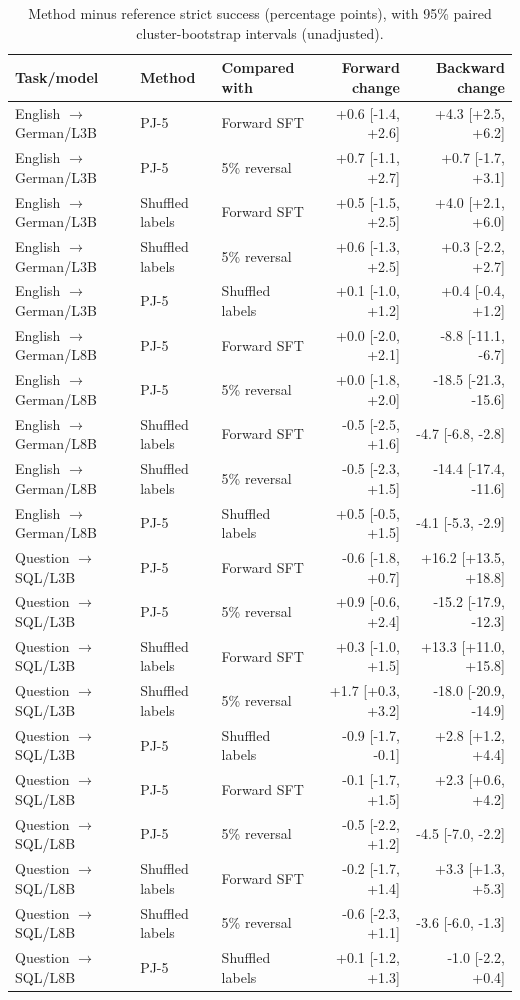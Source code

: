 \begin{table}[t]\centering\footnotesize
\begin{tabular}{lllrr}\toprule
Task/model & Method & Compared with & Forward change & Backward change \\\midrule
English $\to$ German/L3B & PJ-5 & Forward SFT & +0.6 [-1.4, +2.6] & +4.3 [+2.5, +6.2] \\
English $\to$ German/L3B & PJ-5 & 5\% reversal & +0.7 [-1.1, +2.7] & +0.7 [-1.7, +3.1] \\
English $\to$ German/L3B & Shuffled labels & Forward SFT & +0.5 [-1.5, +2.5] & +4.0 [+2.1, +6.0] \\
English $\to$ German/L3B & Shuffled labels & 5\% reversal & +0.6 [-1.3, +2.5] & +0.3 [-2.2, +2.7] \\
English $\to$ German/L3B & PJ-5 & Shuffled labels & +0.1 [-1.0, +1.2] & +0.4 [-0.4, +1.2] \\
English $\to$ German/L8B & PJ-5 & Forward SFT & +0.0 [-2.0, +2.1] & -8.8 [-11.1, -6.7] \\
English $\to$ German/L8B & PJ-5 & 5\% reversal & +0.0 [-1.8, +2.0] & -18.5 [-21.3, -15.6] \\
English $\to$ German/L8B & Shuffled labels & Forward SFT & -0.5 [-2.5, +1.6] & -4.7 [-6.8, -2.8] \\
English $\to$ German/L8B & Shuffled labels & 5\% reversal & -0.5 [-2.3, +1.5] & -14.4 [-17.4, -11.6] \\
English $\to$ German/L8B & PJ-5 & Shuffled labels & +0.5 [-0.5, +1.5] & -4.1 [-5.3, -2.9] \\
Question $\to$ SQL/L3B & PJ-5 & Forward SFT & -0.6 [-1.8, +0.7] & +16.2 [+13.5, +18.8] \\
Question $\to$ SQL/L3B & PJ-5 & 5\% reversal & +0.9 [-0.6, +2.4] & -15.2 [-17.9, -12.3] \\
Question $\to$ SQL/L3B & Shuffled labels & Forward SFT & +0.3 [-1.0, +1.5] & +13.3 [+11.0, +15.8] \\
Question $\to$ SQL/L3B & Shuffled labels & 5\% reversal & +1.7 [+0.3, +3.2] & -18.0 [-20.9, -14.9] \\
Question $\to$ SQL/L3B & PJ-5 & Shuffled labels & -0.9 [-1.7, -0.1] & +2.8 [+1.2, +4.4] \\
Question $\to$ SQL/L8B & PJ-5 & Forward SFT & -0.1 [-1.7, +1.5] & +2.3 [+0.6, +4.2] \\
Question $\to$ SQL/L8B & PJ-5 & 5\% reversal & -0.5 [-2.2, +1.2] & -4.5 [-7.0, -2.2] \\
Question $\to$ SQL/L8B & Shuffled labels & Forward SFT & -0.2 [-1.7, +1.4] & +3.3 [+1.3, +5.3] \\
Question $\to$ SQL/L8B & Shuffled labels & 5\% reversal & -0.6 [-2.3, +1.1] & -3.6 [-6.0, -1.3] \\
Question $\to$ SQL/L8B & PJ-5 & Shuffled labels & +0.1 [-1.2, +1.3] & -1.0 [-2.2, +0.4] \\
\bottomrule\end{tabular}
\caption{Method minus reference strict success (percentage points), with 95\% paired cluster-bootstrap intervals (unadjusted).}\label{tab:paired-judgment-intervals}\end{table}
